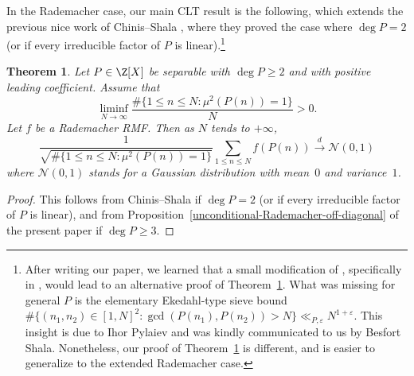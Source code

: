 \documentclass[reqno, 12pt]{amsart}
\theoremstyle{plain}
\newtheorem{theorem}{Theorem}[section]
\theoremstyle{definition}
\theoremstyle{remark}
\renewcommand{\le}{\leqslant}
\renewcommand{\ge}{\geqslant}
\begin{document}
In the Rademacher case, our main CLT result is the following,
which extends the previous nice work of Chinis--Shala \cite{CS25}, where they proved the case where $\deg{P} = 2$
(or if every irreducible factor of $P$ is linear).\footnote{After writing our paper, we learned that a small modification of \cite{CS25}, specifically in \cite[\S3.2.2]{CS25}, would lead to an alternative proof of Theorem~\ref{rademacher-P}.
What was missing for general $P$
is the elementary Ekedahl-type sieve bound
$\#\{(n_1,n_2)\in [1,N]^2: \gcd(P(n_1),P(n_2))>N\} \ll_{P,\varepsilon} N^{1+\varepsilon}$.
This insight is due to Ihor Pylaiev
and was kindly communicated to us by Besfort Shala.
Nonetheless, our proof of Theorem~\ref{rademacher-P}
is different,
and is easier to generalize to the extended Rademacher case.}
\begin{theorem}
\label{rademacher-P}
Let $P\in \Z[X] $ be separable with $\deg{P}\ge 2$
and with positive leading coefficient.
Assume that
\begin{equation}
\label{count-square-free-values}
\liminf_{N\to \infty} \frac{\#\{1\le n\le N: \mu^2(P(n))=1\}}{N} > 0.
\end{equation}
Let $f$ be a Rademacher RMF.
Then as $N$ tends to $+\infty$,
\[ \frac{1}{\sqrt{\#\{1\le n\le N: \mu^2(P(n))=1\}}} \sum_{1\le n \le N} f(P(n))
\xrightarrow[]{d} \mathcal{N}(0,1) \]
where $\mathcal{N}(0,1)$ stands for a Gaussian distribution with mean~$0$ and variance~$1$. 
\end{theorem}


\begin{proof}
This follows from Chinis--Shala \cite{CS25} if $\deg{P} = 2$
(or if every irreducible factor of $P$ is linear),
and from Proposition~\ref{unconditional-Rademacher-off-diagonal} of the present paper
if $\deg{P} \ge 3$.
\end{proof}
\end{document}
